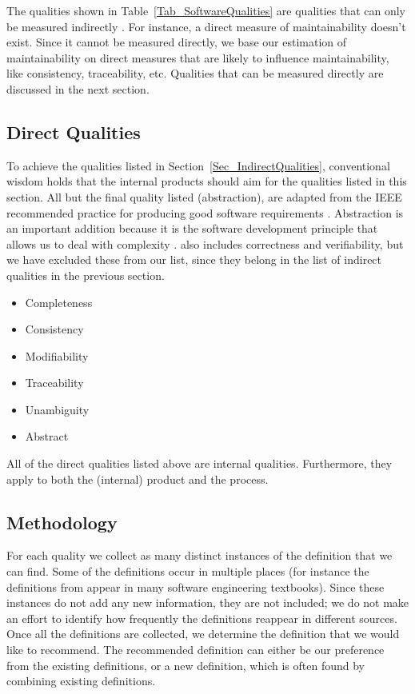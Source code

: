 \documentclass[letterpaper, cleveref]{lipics-v2019}
\theoremstyle{definition}
\begin{document}
The qualities shown in Table~\ref{Tab_SoftwareQualities} are qualities that can
only be measured indirectly \citep[p.\ 109]{VanVliet2000}.  For instance, a
direct measure of maintainability doesn't exist.  Since it cannot be measured
directly, we base our estimation of maintainability on direct measures that are
likely to influence maintainability, like consistency, traceability, etc.
Qualities that can be measured directly are discussed in the next section.

\subsection{Direct Qualities} \label{SecDirectQsIntro}

To achieve the qualities listed in Section~\ref{Sec_IndirectQualities},
conventional wisdom holds that the internal products should aim for the
qualities listed in this section.  All but the final quality listed
(abstraction), are adapted from the IEEE recommended practice for producing good
software requirements \citep{IEEE1998}. Abstraction is an important addition
because it is the software development principle that allows us to deal with
complexity \citep[p.~40]{GhezziEtAl2003}. \citet{IEEE1998} also includes
correctness and verifiability, but we have excluded these from our list, since
they belong in the list of indirect qualities in the previous section.

\begin{itemize}
  \item Completeness
  \item Consistency
  \item Modifiability
  \item Traceability
  \item Unambiguity
  \item Abstract
\end{itemize}

All of the direct qualities listed above are internal qualities.  Furthermore,
they apply to both the (internal) product and the process.

\subsection{Methodology} \label{SecMethodology}

For each quality we collect as many distinct instances of the definition that we
can find.  Some of the definitions occur in multiple places (for instance the
definitions from \citet{McCallEtAl1977} appear in many software engineering
textbooks).  Since these instances do not add any new information, they are not
included; we do not make an effort to identify how frequently the definitions
reappear in different sources.  Once all the definitions are collected, we
determine the definition that we would like to recommend.  The recommended
definition can either be our preference from the existing definitions, or a new
definition, which is often found by combining existing definitions.  
\end{document}
